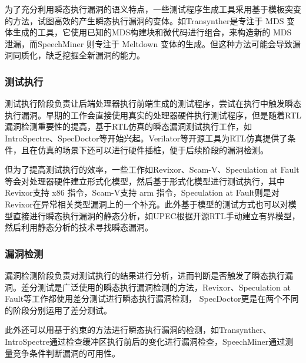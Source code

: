 为了充分利用瞬态执行漏洞的语义特点，一些测试程序生成工具采用基于模板突变的方法，试图高效的产生瞬态执行漏洞的变体。如Transynther\cite{moghimi2020medusa}是专注于 MDS 变体生成的工具，它使用已知的MDS构建块和微代码进行组合，来构造新的 MDS 泄漏，而SpeechMiner \cite{xiao2019speechminer}则专注于 Meltdown 变体的生成。但这种方法可能会导致漏洞同质化，缺乏挖掘全新漏洞的能力。\par

\subsubsection{测试执行}

测试执行阶段负责让后端处理器执行前端生成的测试程序，尝试在执行中触发瞬态执行漏洞。早期的工作会直接使用真实的处理器硬件执行测试程序，但是随着RTL漏洞检测重要性的提高，基于RTL仿真的瞬态漏洞测试执行工作，如IntroSpectre\cite{ghaniyoun2021introspectre}、SpecDoctor\cite{hur2022specdoctor}等开始兴起。Verilator\cite{snyder2013verilator}等开源工具为RTL仿真提供了条件，且在仿真的场景下还可以进行硬件插桩，便于后续阶段的漏洞检测。\par

但为了提高测试执行的效率，一些工作如Revixor\cite{oleksenko2022revizor}、Scam-V\cite{nemati2020validation}、Speculation at Fault\cite{hofmann2023speculation}等会对处理器硬件建立形式化模型，然后基于形式化模型进行测试执行，其中Revixor\cite{oleksenko2022revizor}支持 x86 指令，Scam-V\cite{hofmann2023speculation}支持 arm 指令，Speculation at Fault\cite{hofmann2023speculation}则是对Revixor\cite{oleksenko2022revizor}在异常相关类型漏洞上的一个补充。此外基于模型的测试方式也可以对模型直接进行瞬态执行漏洞的静态分析，如UPEC\cite{fadiheh2020formal}根据开源RTL手动建立有界模型，然后利用静态分析的技术寻找瞬态漏洞。

\subsubsection{漏洞检测}

漏洞检测阶段负责对测试执行的结果进行分析，进而判断是否触发了瞬态执行漏洞。差分测试是广泛使用的瞬态执行漏洞检测的方法，Revixor\cite{oleksenko2022revizor}、Speculation at Fault\cite{hofmann2023speculation}等工作都使用差分测试进行瞬态执行漏洞检测，
SpecDoctor\cite{hur2022specdoctor}更是在两个不同的阶段分别运用了差分测试。\par

此外还可以用基于约束的方法进行瞬态执行漏洞的检测，如Transynther\cite{moghimi2020medusa}、IntroSpectre\cite{ghaniyoun2021introspectre}通过检查缓冲区执行前后的变化进行漏洞检查，SpeechMiner\cite{xiao2019speechminer}通过测量竞争条件判断漏洞的可用性。\par


